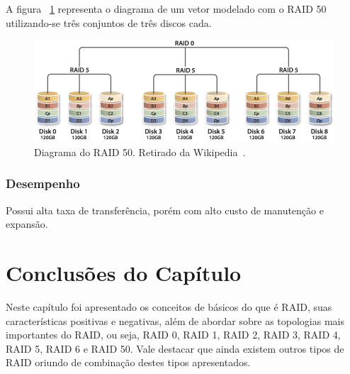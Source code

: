 		A figura ~\ref{fig:raid50} representa o diagrama de um vetor modelado com o RAID 50 utilizando-se três conjuntos de três discos cada.\\
		
		\begin{figure}[htb]
			\begin{center}
				
				\includegraphics[clip,width=15.0cm]{images/RAID_50.png}
				\caption{Diagrama do RAID 50. Retirado da Wikipedia~\citep{wikiRAIDlevels}.}
				\label{fig:raid50}
			\end{center}
		\end{figure} 
		
		\subsubsection{Desempenho}
		Possui alta taxa de transferência, porém com alto custo de manutenção e expansão.
		
	
	\section{Conclusões do Capítulo}
	Neste capítulo foi apresentado os conceitos de básicos do que é RAID, suas características positivas e negativas, além de abordar sobre as topologias mais importantes do RAID, ou seja, RAID 0, RAID 1, RAID 2, RAID 3, RAID 4, RAID 5, RAID 6 e RAID 50.
	Vale destacar que ainda existem outros tipos de RAID oriundo de combinação destes tipos apresentados.
		



 

	

